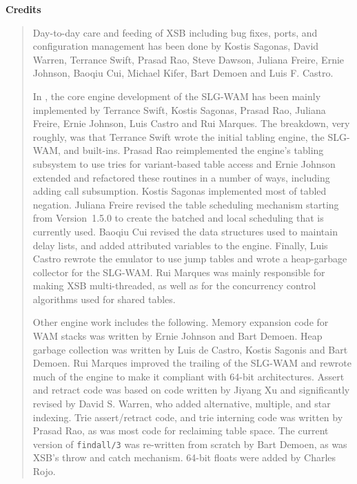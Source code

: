 \begin{center}
{\bf {\Large 
		Credits
}}
\end{center}


\begin{quote}
Day-to-day care and feeding of XSB including bug fixes, ports, and
configuration management has been done by Kostis Sagonas, David
Warren, Terrance Swift, Prasad Rao, Steve Dawson, Juliana Freire,
Ernie Johnson, Baoqiu Cui, Michael Kifer, Bart Demoen and Luis F.
Castro.

In \version, the core engine development of the SLG-WAM has been
mainly implemented by Terrance Swift, Kostis Sagonas, Prasad Rao,
Juliana Freire, Ernie Johnson, Luis Castro and Rui Marques.  The
breakdown, very roughly, was that Terrance Swift wrote the initial
tabling engine, the SLG-WAM, and built-ins.  Prasad Rao reimplemented
the engine's tabling subsystem to use tries for variant-based table
access and Ernie Johnson extended and refactored these routines in a
number of ways, including adding call subsumption.  Kostis Sagonas
implemented most of tabled negation.  Juliana Freire revised the table
scheduling mechanism starting from Version~1.5.0 to create the batched
and local scheduling that is currently used.  Baoqiu Cui revised the
data structures used to maintain delay lists, and added attributed
variables to the engine.  Finally, Luis Castro rewrote the emulator to
use jump tables and wrote a heap-garbage collector for the SLG-WAM.
Rui Marques was mainly responsible for making XSB multi-threaded, as
well as for the concurrency control algorithms used for shared tables.

Other engine work includes the following.  Memory expansion code for
WAM stacks was written by Ernie Johnson and Bart Demoen.  Heap garbage
collection was written by Luis de Castro, Kostis Sagonis and Bart
Demoen.  Rui Marques improved the trailing of the SLG-WAM and rewrote
much of the engine to make it compliant with 64-bit architectures.
Assert and retract code was based on code written by Jiyang Xu and
significantly revised by David S. Warren, who added alternative,
multiple, and star indexing.  Trie assert/retract code, and trie
interning code was written by Prasad Rao, as was most code for
reclaiming table space. The current version of {\tt findall/3} was
re-written from scratch by Bart Demoen, as was XSB's throw and catch
mechanism.  64-bit floats were added by Charles Rojo.


\end{quote}
